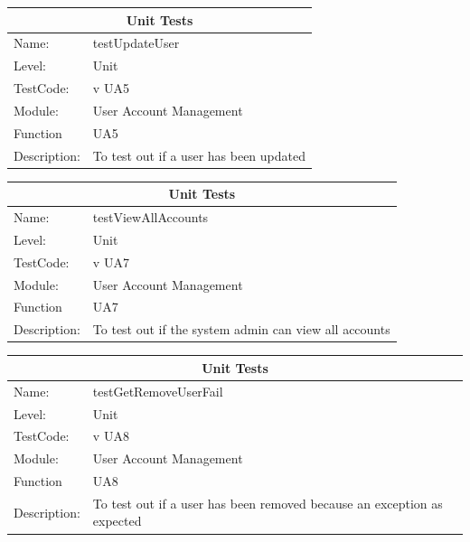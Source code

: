 \documentclass[12pt]{article}
\begin{document}
\begin{center}
\begin{tabular}{|l|p{12cm}|}
\hline
\multicolumn{2}{|c|}{\bf Unit Tests} \\
\hline
 Name: & testUpdateUser \\
\hline
Level: & Unit \\
\hline
TestCode: & v UA5 \\
\hline
Module:& User Account Management\\
\hline
Function & UA5 \\
\hline
Description: & To test out if a user has been updated \\
\hline

\end{tabular}
\end{center}

\begin{center}
\begin{tabular}{|l|p{12cm}|}
\hline
\multicolumn{2}{|c|}{\bf Unit Tests} \\
\hline
 Name: & testViewAllAccounts \\
\hline
Level: & Unit \\
\hline
TestCode: & v UA7 \\
\hline
Module:& User Account Management\\
\hline
Function & UA7 \\
\hline
Description: & To test out if the system admin can view all accounts \\
\hline

\end{tabular}
\end{center}

\begin{center}
\begin{tabular}{|l|p{12cm}|}
\hline
\multicolumn{2}{|c|}{\bf Unit Tests} \\
\hline
 Name: & testGetRemoveUserFail \\
\hline
Level: & Unit \\
\hline
TestCode: & v UA8 \\
\hline
Module:& User Account Management\\
\hline
Function & UA8 \\
\hline
Description: & To test out if a user has been removed because an exception as expected \\
\hline

\end{tabular}
\end{center}
\end{document}
